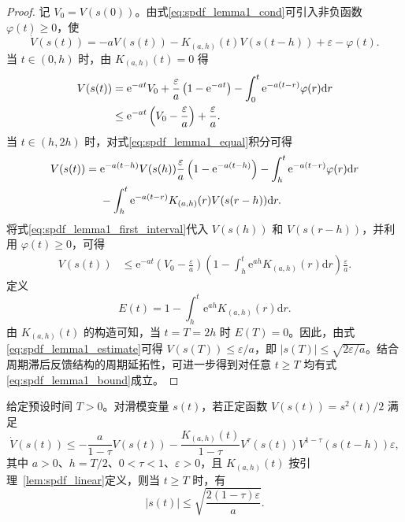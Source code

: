 \begin{proof}
记 $V_0=V(s(0))$。由式\eqref{eq:spdf_lemma1_cond}可引入非负函数 $\varphi(t)\geq0$，使
\begin{equation}
\dot V(s(t))=-aV(s(t))-K_{(a,h)}(t)V(s(t-h))+\varepsilon-\varphi(t).
\label{eq:spdf_lemma1_equal}
\end{equation}
当 $t\in(0,h)$ 时，由 $K_{(a,h)}(t)=0$ 得
\begin{align}
V(s(t))
&=\mathrm e^{-at}V_0+\frac{\varepsilon}{a}\left(1-\mathrm e^{-at}\right)
-\int_0^t \mathrm e^{-a(t-r)}\varphi(r)\mathrm dr \notag\\
&\leq \mathrm e^{-at}\left(V_0-\frac{\varepsilon}{a}\right)+\frac{\varepsilon}{a}.
\label{eq:spdf_lemma1_first_interval}
\end{align}
当 $t\in(h,2h)$ 时，对式\eqref{eq:spdf_lemma1_equal}积分可得
\begin{align}
V(s(t))={}&\mathrm e^{-a(t-h)}V(s(h))
\frac{\varepsilon}{a}\left(1-\mathrm e^{-a(t-h)}\right)
-\int_h^t \mathrm e^{-a(t-r)}\varphi(r)\mathrm dr \notag\\
&-\int_h^t \mathrm e^{-a(t-r)}K_{(a,h)}(r)V(s(r-h))\mathrm dr .
\label{eq:spdf_lemma1_second_interval}
\end{align}
将式\eqref{eq:spdf_lemma1_first_interval}代入 $V(s(h))$ 和 $V(s(r-h))$，并利用 $\varphi(t)\geq0$，可得
\begin{align}
V(s(t))
&\leq
\mathrm e^{-at}\left(V_0-\frac{\varepsilon}{a}\right)
\left(1-\int_h^t \mathrm e^{ah}K_{(a,h)}(r)\mathrm dr\right)
\frac{\varepsilon}{a}.
\label{eq:spdf_lemma1_estimate}
\end{align}
定义
\begin{equation}
E(t)=1-\int_h^t \mathrm e^{ah}K_{(a,h)}(r)\mathrm dr .
\label{eq:spdf_lemma1_E}
\end{equation}
由 $K_{(a,h)}(t)$ 的构造可知，当 $t=T=2h$ 时 $E(T)=0$。因此，由式\eqref{eq:spdf_lemma1_estimate}可得 $V(s(T))\leq \varepsilon/a$，即 $|s(T)|\leq \sqrt{2\varepsilon/a}$。结合周期滞后反馈结构的周期延拓性，可进一步得到对任意 $t\geq T$ 均有式\eqref{eq:spdf_lemma1_bound}成立。
\end{proof}

\begin{lemma}
\label{lem:spdf_nonlinear}
给定预设时间 $T>0$。对滑模变量 $s(t)$，若正定函数 $V(s(t))=s^2(t)/2$ 满足
\begin{equation}
\dot V(s(t))\leq
-\frac{a}{1-\tau}V(s(t))
-\frac{K_{(a,h)}(t)}{1-\tau}V^\tau(s(t))V^{1-\tau}(s(t-h))
\varepsilon,
\label{eq:spdf_lemma2_cond}
\end{equation}
其中 $a>0$、$h=T/2$、$0<\tau<1$、$\varepsilon>0$，且 $K_{(a,h)}(t)$ 按引理~\ref{lem:spdf_linear}定义，则当 $t\geq T$ 时，有
\begin{equation}
|s(t)|\leq \sqrt{\frac{2(1-\tau)\varepsilon}{a}}.
\label{eq:spdf_lemma2_bound}
\end{equation}
\end{lemma}

